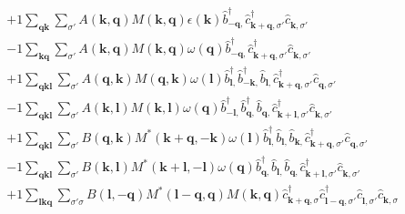 \begin{align*}
	&+1 \sum_{ \mathbf{q} \mathbf{k} } \sum_{ \sigma' } A( \mathbf{k}, \mathbf{q} )  M( \mathbf{k}, \mathbf{q} )  \epsilon( \mathbf{k} )   \hat{b}_{ -\mathbf{q}, }^\dagger  \hat{c}_{ \mathbf{k}+\mathbf{q}, \sigma' }^\dagger  \hat{c}_{ \mathbf{k}, \sigma' }^{\phantom{\dagger}}  \\
	&-1 \sum_{ \mathbf{k} \mathbf{q} } \sum_{ \sigma' } A( \mathbf{k}, \mathbf{q} )  M( \mathbf{k}, \mathbf{q} )  \omega( \mathbf{q} )   \hat{b}_{ -\mathbf{q}, }^\dagger  \hat{c}_{ \mathbf{k}+\mathbf{q}, \sigma' }^\dagger  \hat{c}_{ \mathbf{k}, \sigma' }^{\phantom{\dagger}}  \\
	&+1 \sum_{ \mathbf{q} \mathbf{k} \mathbf{l} } \sum_{ \sigma' } A( \mathbf{q}, \mathbf{k} )  M( \mathbf{q}, \mathbf{k} )  \omega( \mathbf{l} )   \hat{b}_{ \mathbf{l}, }^\dagger  \hat{b}_{ -\mathbf{k}, }^\dagger  \hat{b}_{ \mathbf{l}, }^{\phantom{\dagger}} \hat{c}_{ \mathbf{k}+\mathbf{q}, \sigma' }^\dagger  \hat{c}_{ \mathbf{q}, \sigma' }^{\phantom{\dagger}}  \\
	&-1 \sum_{ \mathbf{q} \mathbf{k} \mathbf{l} } \sum_{ \sigma' } A( \mathbf{k}, \mathbf{l} )  M( \mathbf{k}, \mathbf{l} )  \omega( \mathbf{q} )   \hat{b}_{ -\mathbf{l}, }^\dagger  \hat{b}_{ \mathbf{q}, }^\dagger  \hat{b}_{ \mathbf{q}, }^{\phantom{\dagger}} \hat{c}_{ \mathbf{k}+\mathbf{l}, \sigma' }^\dagger  \hat{c}_{ \mathbf{k}, \sigma' }^{\phantom{\dagger}}  \\
	&+1 \sum_{ \mathbf{q} \mathbf{k} \mathbf{l} } \sum_{ \sigma' } B( \mathbf{q}, \mathbf{k} )  M^*( \mathbf{k}+\mathbf{q}, -\mathbf{k} )  \omega( \mathbf{l} )   \hat{b}_{ \mathbf{l}, }^\dagger  \hat{b}_{ \mathbf{l}, }^{\phantom{\dagger}} \hat{b}_{ \mathbf{k}, }^{\phantom{\dagger}} \hat{c}_{ \mathbf{k}+\mathbf{q}, \sigma' }^\dagger  \hat{c}_{ \mathbf{q}, \sigma' }^{\phantom{\dagger}}  \\
	&-1 \sum_{ \mathbf{q} \mathbf{k} \mathbf{l} } \sum_{ \sigma' } B( \mathbf{k}, \mathbf{l} )  M^*( \mathbf{k}+\mathbf{l}, -\mathbf{l} )  \omega( \mathbf{q} )   \hat{b}_{ \mathbf{q}, }^\dagger  \hat{b}_{ \mathbf{l}, }^{\phantom{\dagger}} \hat{b}_{ \mathbf{q}, }^{\phantom{\dagger}} \hat{c}_{ \mathbf{k}+\mathbf{l}, \sigma' }^\dagger  \hat{c}_{ \mathbf{k}, \sigma' }^{\phantom{\dagger}}  \\
	&+1 \sum_{ \mathbf{l} \mathbf{k} \mathbf{q} } \sum_{ \sigma' \sigma } B( \mathbf{l}, -\mathbf{q} )  M^*( \mathbf{l}-\mathbf{q}, \mathbf{q} )  M( \mathbf{k}, \mathbf{q} )   \hat{c}_{ \mathbf{k}+\mathbf{q}, \sigma }^\dagger  \hat{c}_{ \mathbf{l}-\mathbf{q}, \sigma' }^\dagger  \hat{c}_{ \mathbf{l}, \sigma' }^{\phantom{\dagger}} \hat{c}_{ \mathbf{k}, \sigma }^{\phantom{\dagger}}  \\

\end{align*}
